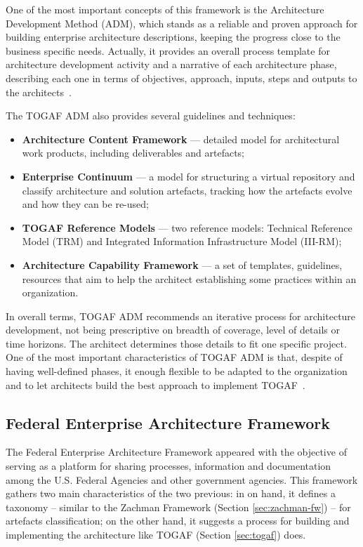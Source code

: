 One of the most important concepts of this framework is the Architecture Development Method (ADM), which stands as a reliable and proven approach for building enterprise architecture descriptions, keeping the progress close to the business specific needs. Actually, it provides an overall process template for architecture development activity and a narrative of each architecture phase, describing each one in terms of objectives, approach, inputs, steps and outputs to the architects~\citep{Leist2006}.

The TOGAF ADM also provides several guidelines and techniques:
\begin{itemize}
\item \textbf{Architecture Content Framework} --- detailed model for architectural work products, including deliverables and artefacts;
\item \textbf{Enterprise Continuum} --- a model for structuring a virtual repository and classify architecture and solution artefacts, tracking how the artefacts evolve and how they can be re-used;
\item \textbf{TOGAF Reference Models} --- two reference models: Technical Reference Model (TRM) and Integrated Information Infrastructure Model (III-RM);
\item \textbf{Architecture Capability Framework} --- a set of templates, guidelines, resources that aim to help the architect establishing some practices within an organization.
\end{itemize}

In overall terms, TOGAF ADM recommends an iterative process for architecture development, not being prescriptive on breadth of coverage, level of details or time horizons. The architect determines those details to fit one specific project. One of the most important characteristics of TOGAF ADM is that, despite of having well-defined phases, it enough flexible to be adapted to the organization and to let architects build the best approach to implement TOGAF~\citep{Tang2004}.









\subsection{Federal Enterprise Architecture Framework} \label{sec:feaf}

The Federal Enterprise Architecture Framework appeared with the objective of serving as a platform for sharing processes, information and documentation among the U.S. Federal Agencies and other government agencies. This framework gathers two main characteristics of the two previous: in on hand, it defines a taxonomy -- similar to the Zachman Framework (Section \ref{sec:zachman-fw}) -- for artefacts classification; on the other hand, it suggests a process for building and implementing the architecture like TOGAF (Section \ref{sec:togaf}) does. 

